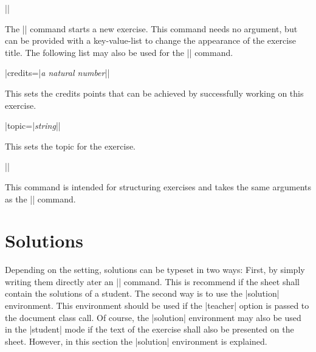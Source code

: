 \documentclass[a4paper,fleqn]{report}
\def\syntaxdefaultarg#1{\hfill\texttt{\small #1}\par\smallskip\noindent\ignorespaces}
\def\metaargument#1{\textit{\small #1}}
\begin{document}
\begin{syntax}
  |\exercise[|\metaargument{key-value-list}|]| \syntaxdefaultarg{}
  The |\exercise| command starts a new exercise. This command needs no
  argument, but can be provided with a key-value-list to change the
  appearance of the exercise title. The following list may also be
  used for the |\subexercise| command.
  \begin{syntax}
    |credits={|\metaargument{a natural number}|}| \syntaxdefaultarg{}
    This sets the credits points that can be achieved by successfully
    working on this exercise.
  \end{syntax}
  \begin{syntax}
    |topic={|\metaargument{string}|}| \syntaxdefaultarg{}
    This sets the topic for the exercise.
  \end{syntax}
\end{syntax}

\begin{syntax}
  |\subexercise[|\metaargument{key-value-list}|]| \syntaxdefaultarg{}
  This command is intended for structuring exercises and takes the
  same arguments as the |\exercise| command.
\end{syntax}


\section{Solutions}

Depending on the setting, solutions can be typeset in two ways: First,
by simply writing them directly ater an |\exercise| command. This is
recommend if the sheet shall contain the solutions of a student. The
second way is to use the |solution| environment. This environment
should be used if the |teacher| option is passed to the document class
call. Of course, the |solution| environment may also be used in
the |student| mode if the text of the exercise shall also be presented
on the sheet. However, in this section the |solution| environment is
explained.
\end{document}
